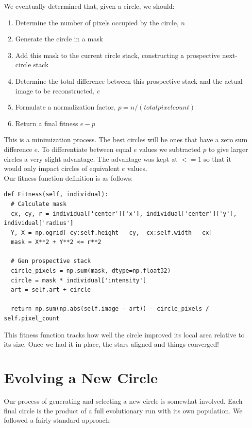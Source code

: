 \documentclass[12pt]{article}
\begin{document}
We eventually determined that, given a circle, we should:
\begin{enumerate}
\item Determine the number of pixels occupied by the circle, $n$
\item Generate the circle in a mask
\item Add this mask to the current circle stack, constructing  a prospective next-circle stack
\item Determine the total difference between this prospective stack and the actual image to be reconstructed, $e$
\item Formulate a normalization factor, $p = n/(total pixel count)$
\item Return a final fitness $e - p$
\end{enumerate}

This is a minimization process. The best circles will be ones that have a zero sum difference $e$. To differentiate between equal $e$ values we subtracted $p$ to give larger circles a very slight advantage. The advantage was kept at $<= 1$ so that it would only impact circles of equivalent $e$ values.
\\

Our fitness function definition is as follows:

\begin{verbatim}
def Fitness(self, individual):
  # Calculate mask
  cx, cy, r = individual['center']['x'], individual['center']['y'], individual['radius']
  Y, X = np.ogrid[-cy:self.height - cy, -cx:self.width - cx]
  mask = X**2 + Y**2 <= r**2                
  
  # Gen prospective stack
  circle_pixels = np.sum(mask, dtype=np.float32)
  circle = mask * individual['intensity']
  art = self.art + circle

  return np.sum(np.abs(self.image - art)) - circle_pixels / self.pixel_count
\end{verbatim}

This fitness function tracks how well the circle improved its local area relative to its size. Once we had it in place, the stars aligned and things converged!

\section*{Evolving a New Circle}
Our process of generating and selecting a new circle is somewhat involved. Each final circle is the product of a full evolutionary run with its own population. We followed a fairly standard approach:
\end{document}
